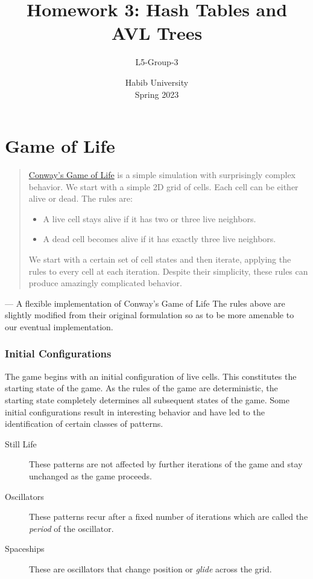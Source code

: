 \documentclass[addpoints]{exam}
\title{Homework 3: Hash Tables and AVL Trees}
\author{L5-Group-3}  %
\date{Habib University\\Spring 2023}
\begin{document}
\maketitle
\part{Game of Life}
\label{sec:imgops}

\begin{quotation}
  \href{https://en.wikipedia.org/wiki/Conway's_Game_of_Life}{Conway’s Game of Life} is a simple simulation with surprisingly complex behavior. We start with a simple 2D grid of cells. Each cell can be either alive or dead. The rules are:
  \begin{itemize}
    \item A live cell stays alive if it has two or three live neighbors.
    \item A dead cell becomes alive if it has exactly three live neighbors.
  \end{itemize}
  We start with a certain set of cell states and then iterate, applying the rules to every cell at each iteration. Despite their simplicity, these rules can produce amazingly complicated behavior.
\end{quotation}
\raggedleft --- A flexible implementation of Conway's Game of Life \cite{gol_impl}
\justify
The rules above are slightly modified from their original formulation so as to be more amenable to our eventual implementation.

\section*{Initial Configurations}

The game begins with an initial configuration of live cells. This constitutes the starting state of the game. As the rules of the game are deterministic, the starting state completely determines all subsequent states of the game. Some initial configurations result in interesting behavior and have led to the identification of certain classes of patterns.
\begin{description}
  \item[Still Life] These patterns are not affected by further iterations of the game and stay unchanged as the game proceeds.
  \item[Oscillators] These patterns recur after a fixed number of iterations which are called the \textit{period} of the oscillator.
  \item[Spaceships] These are oscillators that change position or \textit{glide} across the grid.
\end{description}
\end{document}
